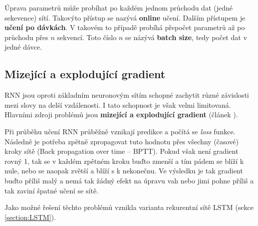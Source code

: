 Úprava parametrů může probíhat po každém jednom průchodu dat (jedné sekevence) sítí. Takovýto přístup se nazývá \textbf{online} učení. Dalším přístupem je \textbf{učení po dávkách}. V takovém to případě probíhá přepočet parametrů až po průchodu přes $n$ sekvencí. Toto číslo $n$ se názývá \textbf{batch size}, tedy počet dat v jedné dávce.

%
%
%


\subsection{Mizející a explodující gradient} \label{subsection:gradient}
RNN jsou oproti základním neuronovým sítím schopné zachytit různé závislosti mezi slovy na delší vzdálenosti. I tato schopnost je však velmi limitovaná. Hlavními zdroji problémů jsou \textbf{mizející a explodující gradient} (článek \cite{gradientProblems}).
%

Při průběhu učení RNN průběžně vznikají predikce a počítá se \emph{loss} funkce. Následně je potřeba zpětně zpropagovat tuto hodnotu přes všechny (časové) kroky sítě (Back propagation over time -- BPTT). Pokud však není gradient rovný 1, tak se v každém zpětném kroku buďto zmenší a tím pádem se blíží k nule, nebo se naopak zvětší a blíží s k nekonečnu. Ve výsledku je tak gradient buďto příliš malý a nemá tak žádný efekt na úpravu vah nebo jimi pohne příliš a tak zaviní špatné učení se sítě.

Jako možné řešení těchto problémů vznikla varianta rekurentní sítě LSTM (sekce \ref{section:LSTM}).


